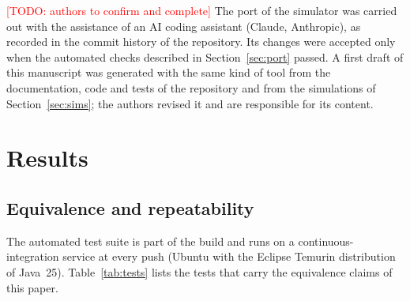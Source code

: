 \documentclass[pdflatex,sn-apa,iicol]{sn-jnl}
\newcommand{\TODO}[1]{\textcolor{red}{[TODO: #1]}}
\begin{document}
\TODO{authors to confirm and complete} The port of the simulator was carried out with the assistance of an AI coding assistant (Claude, Anthropic), as recorded in the commit history of the repository. Its changes were accepted only when the automated checks described in Section~\ref{sec:port} passed. A first draft of this manuscript was generated with the same kind of tool from the documentation, code and tests of the repository and from the simulations of Section~\ref{sec:sims}; the authors revised it and are responsible for its content.

\section{Results}\label{sec:results}

\subsection{Equivalence and repeatability}\label{sec:checks}

The automated test suite is part of the build and runs on a continuous-integration service at every push (Ubuntu with the Eclipse Temurin distribution of Java~25). Table~\ref{tab:tests} lists the tests that carry the equivalence claims of this paper.
\end{document}
